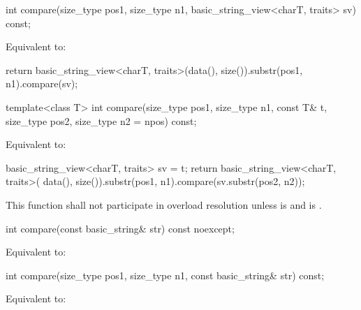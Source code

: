 %
\begin{itemdecl}
int compare(size_type pos1, size_type n1, basic_string_view<charT, traits> sv) const;
\end{itemdecl}

\begin{itemdescr}
\pnum
\effects
Equivalent to:
\begin{codeblock}
return basic_string_view<charT, traits>(data(), size()).substr(pos1, n1).compare(sv);
\end{codeblock}
\end{itemdescr}

%
\begin{itemdecl}
template<class T>
  int compare(size_type pos1, size_type n1, const T& t,
              size_type pos2, size_type n2 = npos) const;
\end{itemdecl}

\begin{itemdescr}
\pnum
\effects
Equivalent to:
\begin{codeblock}
basic_string_view<charT, traits> sv = t;
return basic_string_view<charT, traits>(
    data(), size()).substr(pos1, n1).compare(sv.substr(pos2, n2));
\end{codeblock}

\pnum
\remarks
This function shall not participate in overload resolution
unless 
is  and  is .
\end{itemdescr}

%
\begin{itemdecl}
int compare(const basic_string& str) const noexcept;
\end{itemdecl}

\begin{itemdescr}
\pnum
\effects
Equivalent to:
\end{itemdescr}

%
\begin{itemdecl}
int compare(size_type pos1, size_type n1, const basic_string& str) const;
\end{itemdecl}

\begin{itemdescr}
\pnum
\effects
Equivalent to:
\end{itemdescr}

